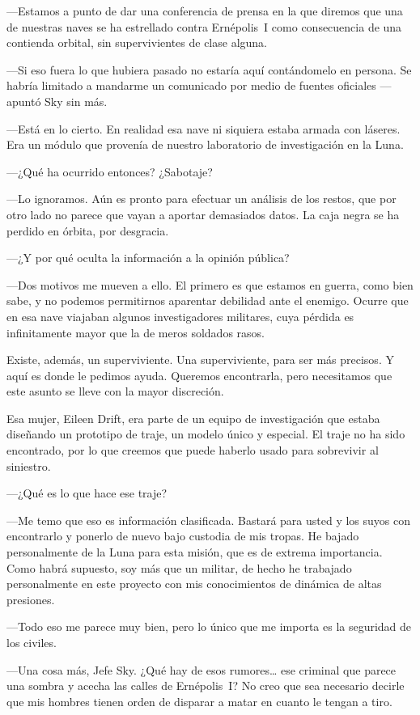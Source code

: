 ---Estamos a punto de dar una conferencia de prensa en la que diremos que una de nuestras naves se ha estrellado contra Ernépolis~I como consecuencia de una contienda orbital, sin supervivientes de clase alguna.

---Si eso fuera lo que hubiera pasado no estaría aquí contándomelo en persona. Se habría limitado a mandarme un comunicado por medio de fuentes oficiales ---apuntó Sky sin más.

---Está en lo cierto. En realidad esa nave ni siquiera estaba armada con láseres. Era un módulo que provenía de nuestro laboratorio de investigación en la Luna.

---¿Qué ha ocurrido entonces? ¿Sabotaje?

---Lo ignoramos. Aún es pronto para efectuar un análisis de los restos, que por otro lado no parece que vayan a aportar demasiados datos. La caja negra se ha perdido en órbita, por desgracia.

---¿Y por qué oculta la información a la opinión pública?

---Dos motivos me mueven a ello. El primero es que estamos en guerra, como bien sabe, y no podemos permitirnos aparentar debilidad ante el enemigo. Ocurre que en esa nave viajaban algunos investigadores militares, cuya pérdida es infinitamente mayor que la de meros soldados rasos.

\rquoti{}Existe, además, un superviviente. Una superviviente, para ser más precisos. Y aquí es donde le pedimos ayuda. Queremos encontrarla, pero necesitamos que este asunto se lleve con la mayor discreción.

\rquoti{}Esa mujer, Eileen Drift, era parte de un equipo de investigación que estaba diseñando un prototipo de traje, un modelo único y especial. El traje no ha sido encontrado, por lo que creemos que puede haberlo usado para sobrevivir al siniestro.

---¿Qué es lo que hace ese traje?

---Me temo que eso es información clasificada. Bastará para usted y los suyos con encontrarlo y ponerlo de nuevo bajo custodia de mis tropas. He bajado personalmente de la Luna para esta misión, que es de extrema importancia. Como habrá supuesto, soy más que un militar, de hecho he trabajado personalmente en este proyecto con mis conocimientos de dinámica de altas presiones.

---Todo eso me parece muy bien, pero lo único que me importa es la seguridad de los civiles.

---Una cosa más, Jefe Sky. ¿Qué hay de esos rumores\dots{} ese criminal que parece una sombra y acecha las calles de Ernépolis~I? No creo que sea necesario decirle que mis hombres tienen orden de disparar a matar en cuanto le tengan a tiro.

